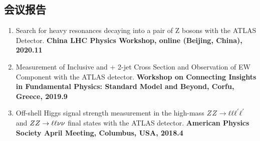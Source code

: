 \begin{publications}
\section*{会议报告}
\begin{enumerate}
    \item Search for heavy resonances decaying into a pair of Z bosons with the ATLAS Detector. \textbf{China LHC Physics Workshop, online (Beijing, China), 2020.11}
    \item Measurement of Inclusive \llll and \llvv + 2-jet Cross Section and Observation of EW Component with the ATLAS detector. \textbf{Workshop on Connecting Insights in Fundamental Physics: Standard Model and Beyond, Corfu, Greece, 2019.9}
    \item Off-shell Higgs signal strength measurement in the high-mass $ZZ \rightarrow \ell\ell\ell^{'}\ell^{'}$ and $ZZ \rightarrow \ell\ell\nu\nu$ final states with the ATLAS detector. \textbf{American Physics Society April Meeting, Columbus, USA, 2018.4}
\end{enumerate}

\end{publications}

